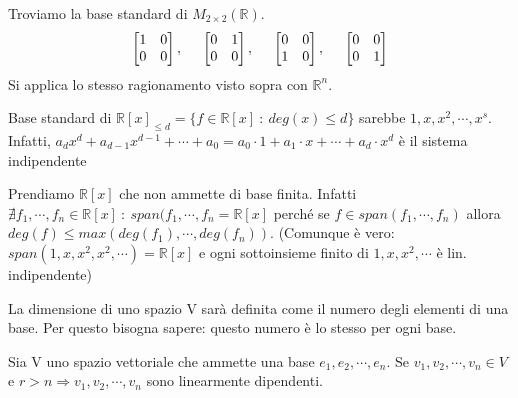 \begin{example}
Troviamo la base standard di $M_{2\times2}(\mathbb{R})$.
\[\begin{bmatrix}1&0\\0&0\end{bmatrix}, \hspace{.5cm} \begin{bmatrix}0&1\\0&0\end{bmatrix}, \hspace{.5cm} \begin{bmatrix}0&0\\1&0\end{bmatrix}, \hspace{.5cm} \begin{bmatrix}0&0\\0&1\end{bmatrix}\]
Si applica lo stesso ragionamento visto sopra con $\mathbb{R}^n$.
\end{example}

\begin{example}
Base standard di $\mathbb{R}[x]_{\leq d} = \{f \in \mathbb{R}[x] \::\: deg(x) \leq d\}$ sarebbe $1, x, x^2, \cdots, x^s$. Infatti, $a_dx^d + a_{d-1}x^{d-1} + \cdots + a_0 = a_0 \cdot 1 + a_1 \cdot x + \cdots + a_d \cdot x^d$ è il sistema indipendente
\end{example}
\begin{example}
Prendiamo $\mathbb{R}[x]$ che non ammette di base finita. Infatti $\nexists f_1, \cdots, f_n \in \mathbb{R}[x] \::\: span(f_1, \cdots, f_n = \mathbb{R}[x]$ perché se $f \in span(f_1, \cdots, f_n)$ allora $deg(f) \leq max(deg(f_1), \cdots, deg(f_n))$. (Comunque è vero: $span(1,x,x^2, x^2, \cdots) = \mathbb{R}[x]$ e ogni sottoinsieme finito di $1,x, x^2, \cdots$ è lin. indipendente)
\end{example}

La dimensione di uno spazio V sarà definita come il numero degli elementi di una base. Per questo bisogna sapere: questo numero è lo stesso per ogni base.
\begin{proposition}
Sia V uno spazio vettoriale che ammette una base $e_1, e_2, \cdots, e_n$. Se $v_1, v_2, \cdots, v_n \in V$ e $r > n \Longrightarrow v_1, v_2, \cdots, v_n$ sono linearmente dipendenti.
\end{proposition}

